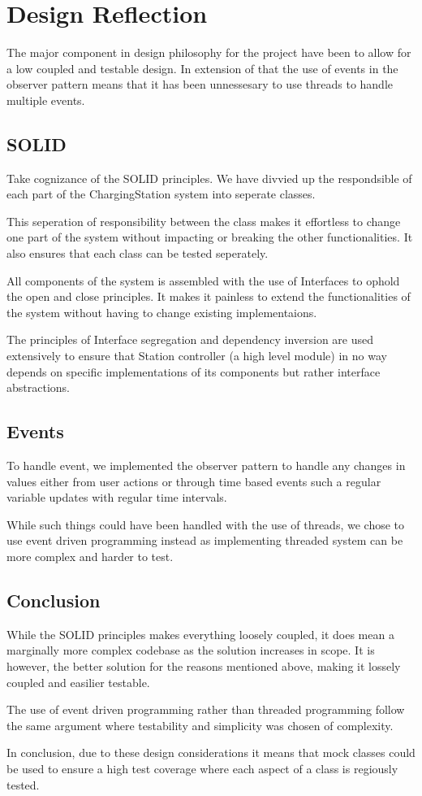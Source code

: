 \section{Design Reflection}

The major component in design philosophy for the project have been to 
allow for a low coupled and testable design. In extension of that
the use of events in the observer pattern means that it has 
been unnessesary to use threads to handle multiple events.

\subsection{SOLID}

Take cognizance of the SOLID principles. We have divvied up the respondsible 
of each part of the ChargingStation system into seperate classes. 

This seperation of responsibility between the class makes it effortless to change 
one part of the system without impacting or breaking the other functionalities.
It also ensures that each class can be tested seperately. 

All components of the system is assembled with the use of Interfaces to ophold the
open and close principles. It makes it painless to extend the functionalities of
the system without having to change existing implementaions.

The principles of Interface segregation and dependency inversion are used extensively
to ensure that Station controller (a high level module) in no way depends on specific
implementations of its components but rather interface abstractions. 


\subsection{Events}

To handle event, we implemented the observer pattern to handle any changes in values
either from user actions or through time based events such a regular variable updates
with regular time intervals.

While such things could have been handled with the use of threads, we chose to use
event driven programming instead as implementing threaded system can be more complex
and harder to test.

\subsection{Conclusion}

While the SOLID principles makes everything loosely coupled, it does mean a marginally more
complex codebase as the solution increases in scope. It is however, the better solution
for the reasons mentioned above, making it lossely coupled and easilier testable.

The use of event driven programming rather than threaded programming follow the same 
argument where testability and simplicity was chosen of complexity.

In conclusion, due to these design considerations it means that mock classes could be 
used to ensure a high test coverage where each aspect of a class is regiously tested.

\newpage
